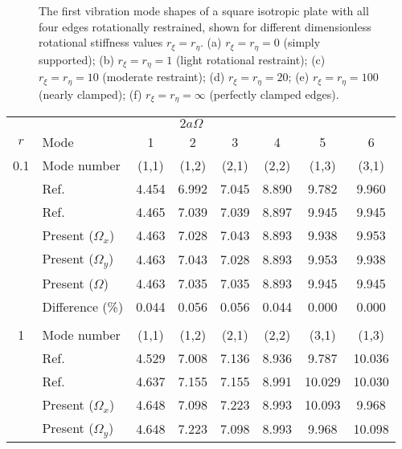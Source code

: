 \documentclass[preprint,12pt,number]{elsarticle}
\begin{document}
\begin{figure}[p]
{\begin{minipage}{\textwidth}
		\caption{\normalsize
			The first vibration mode shapes of a square isotropic plate with all four edges rotationally restrained, 
			shown for different dimensionless rotational stiffness values \(r_{\xi} = r_{\eta}\). 
			(a) \(r_{\xi} = r_{\eta} = 0\) (simply supported);  
			(b) \(r_{\xi} = r_{\eta} = 1\) (light rotational restraint);  
			(c) \(r_{\xi} = r_{\eta} = 10\) (moderate restraint);  
			(d) \(r_{\xi} = r_{\eta} = 20\);  
			(e) \(r_{\xi} = r_{\eta} = 100\) (nearly clamped);  
			(f) \(r_{\xi} = r_{\eta} = \infty\) (perfectly clamped edges).
		}
		\label{fig:iso}
		\end{minipage}
	}
\end{figure}

\begin{table}[!htbp]

\begin{tabular}{c l c c c c c c}
	\toprule
	\multicolumn{1}{c}{} & \multicolumn{6}{c}{$2a\Omega$} \\ 
	\cmidrule(lr){3-8}
	$r$ & Mode & 1 & 2 & 3 & 4 & 5 & 6 \\ 
	\midrule
	0.1 & Mode number   & (1,1) & (1,2) & (2,1) & (2,2) & (1,3) & (3,1) \\
	& Ref.\Citealp{mukhopadhyay1979free} & 4.454 & 6.992 & 7.045 & 8.890  & 9.782  & 9.960 \\
	& Ref.\Citealp{zhang2019new} & 4.465 & 7.039 & 7.039 &8.897  &9.945& 9.945 \\
	& Present ($\Omega_x$)   & 4.463     & 7.028     & 7.043     & 8.893     & 9.938       & 9.953  \\
	& Present ($\Omega_y$)   & 4.463    &7.043     &  7.028       & 8.893   &  9.953    & 9.938 \\ 
	& Present ($\Omega$)   & 4.463    & 7.035     & 7.035      &8.893     & 9.945     & 9.945   \\
	&Difference (\%)& 0.044     & 0.056      & 0.056      & 0.044     &  0.000     & 0.000
	\\
	\\
	1 & Mode number   &  (1,1) & (1,2) & (2,1) & (2,2) & (3,1) & (1,3) \\
	& Ref.\Citealp{mukhopadhyay1979free} & 4.529& 7.008 &7.136 &8.936& 9.787& 10.036 \\
	& Ref.\Citealp{zhang2019new} & 4.637 &7.155 & 7.155 & 8.991 & 10.029 & 10.030 \\
	& Present ($\Omega_x$)   & 4.648     & 7.098      &7.223     & 8.993     &   10.093    & 9.968  \\
	& Present ($\Omega_y$)   & 4.648     & 7.223     & 7.098       & 8.993     &   9.968     & 10.098

\end{tabular}
\end{table}
\end{document}
